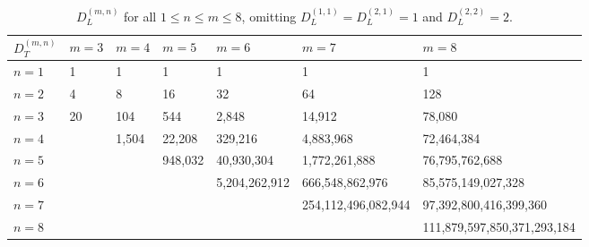 \documentclass{article}
\begin{document}
\begin{table}
\begin{center}
    \begin{tabular}{|l|l|l|l|l|l|l|}
\hline
$D_T^{(m,n)}$  & $m=3$ & $m=4$   & $m=5$     & $m=6$           & $m=7$                 & $m=8$                    \\ \hline
$n=1$          & 1   & 1     & 1       & 1             & 1                   & 1                               \\ \hline
$n=2$          & 4   & 8     & 16      & 32            & 64                  & 128                                        \\ \hline
$n=3$          & 20  & 104   & 544     & 2,848         & 14,912              & 78,080                                             \\ \hline
$n=4$           &       & 1,504 & 22,208  & 329,216       & 4,883,968           & 72,464,384           \                             \\ \hline
$n=5$           &       &         & 948,032 & 40,930,304    & 1,772,261,888       & 76,795,762,688                                      \\ \hline
$n=6$             &       &         &           & 5,204,262,912 & 666,548,862,976     & 85,575,149,027,328                               \\ \hline
$n=7$              &       &         &           &                 & 254,112,496,082,944 & 97,392,800,416,399,360                             \\ \hline
$n=8$           &       &         &           &                 &                       & 111,879,597,850,371,293,184                 \\ \hline
\end{tabular}
    \caption{$D_L^{(m,n)}$ for all $1\leq n\leq m\leq 8$, omitting $D_L^{(1,1)}=D_L^{(2,1)}=1$ and $D_L^{(2,2)}=2$.}
    \label{tab:mosaic-counts-2}
\end{center}


\end{table}
\end{document}
